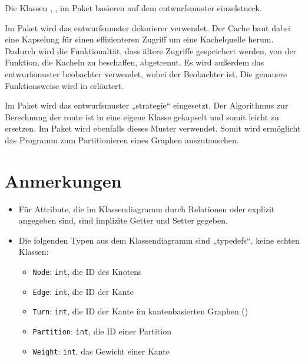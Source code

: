 \documentclass[a4paper, 11pt]{article}
\newcommand{\code}[1]{\texttt{#1}}
\begin{document}
Die Klassen , ,  im Paket  basieren auf dem \gls{entwurfsmuster} \gls{einzelstueck}. %

Im Paket  wird das \gls{entwurfsmuster} \gls{dekorierer} verwendet.
Der Cache baut dabei eine Kapselung für einen effizienteren Zugriff um eine Kachelquelle herum.
Dadurch wird die Funktionaltät, dass ältere Zugriffe gespeichert werden, von der Funktion, die Kacheln zu beschaffen, abgetrennt.
Es wird außerdem das \gls{entwurfsmuster} \gls{beobachter} verwendet, wobei  der Beobachter ist. Die genauere Funktionsweise wird in  erläutert.


Im Paket  wird das  \gls{entwurfsmuster} „\gls{strategie}“ eingesetzt.
Der Algorithmus zur Berechnung der \gls{route} ist in eine eigene Klasse  gekapselt und somit leicht zu ersetzen.  
Im Paket  wird ebenfalls dieses Muster verwendet. Somit wird ermöglicht das Programm zum Partitionieren eines Graphen auszutauschen.

\section{Anmerkungen}

\begin{itemize}
\item Für Attribute, die im Klassendiagramm durch Relationen oder explizit angegeben sind, sind implizite Getter und Setter gegeben.
\item Die folgenden Typen aus dem Klassendiagramm sind „typedefs“, keine echten Klassen:
  \begin{itemize}
  \item \code{Node}: \code{int}, die ID des Knotens
  \item \code{Edge}: \code{int}, die ID der Kante
  \item \code{Turn}: \code{int}, die ID der Kante im kantenbasierten Graphen ()
  \item \code{Partition}: \code{int}, die ID einer Partition
  \item \code{Weight}: \code{int}, das Gewicht einer Kante
  \end{itemize}
\end{itemize}
\end{document}
